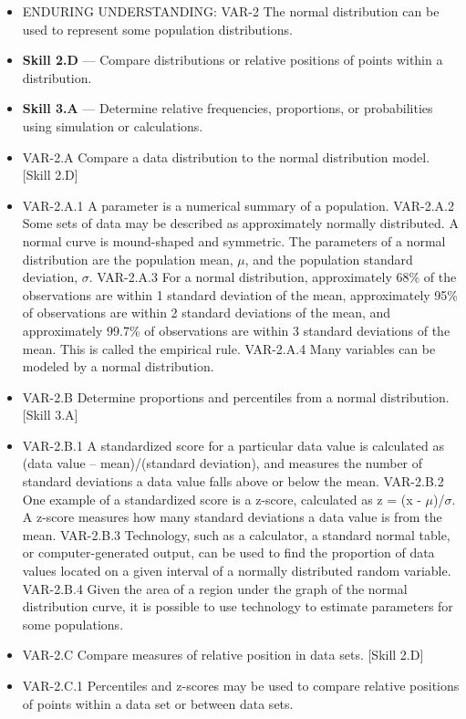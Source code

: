 \documentclass[11pt]{article}
\begin{document}


{\small
\begin{itemize}[leftmargin=1.5em,itemsep=2pt,topsep=2pt]
  \item ENDURING UNDERSTANDING: VAR-2 The normal distribution can be used to represent some population distributions.
  \item \textbf{Skill 2.D} --- Compare distributions or relative positions of points within a distribution.
  \item \textbf{Skill 3.A} --- Determine relative frequencies, proportions, or probabilities using simulation or calculations.
  \item VAR-2.A Compare a data distribution to the normal distribution model. [Skill 2.D]
  \item VAR-2.A.1 A parameter is a numerical summary of a population. VAR-2.A.2 Some sets of data may be described as approximately normally distributed. A normal curve is mound-shaped and symmetric. The parameters of a normal distribution are the population mean, $\mu$, and the population standard deviation, $\sigma$. VAR-2.A.3 For a normal distribution, approximately 68\% of the observations are within 1 standard deviation of the mean, approximately 95\% of observations are within 2 standard deviations of the mean, and approximately 99.7\% of observations are within 3 standard deviations of the mean. This is called the empirical rule. VAR-2.A.4 Many variables can be modeled by a normal distribution.
  \item VAR-2.B Determine proportions and percentiles from a normal distribution. [Skill 3.A]
  \item VAR-2.B.1 A standardized score for a particular data value is calculated as (data value -- mean)/(standard deviation), and measures the number of standard deviations a data value falls above or below the mean. VAR-2.B.2 One example of a standardized score is a z-score, calculated as z = (x - $\mu$)/$\sigma$. A z-score measures how many standard deviations a data value is from the mean. VAR-2.B.3 Technology, such as a calculator, a standard normal table, or computer-generated output, can be used to find the proportion of data values located on a given interval of a normally distributed random variable. VAR-2.B.4 Given the area of a region under the graph of the normal distribution curve, it is possible to use technology to estimate parameters for some populations.
  \item VAR-2.C Compare measures of relative position in data sets. [Skill 2.D]
  \item VAR-2.C.1 Percentiles and z-scores may be used to compare relative positions of points within a data set or between data sets.
\end{itemize}
}
\end{document}
